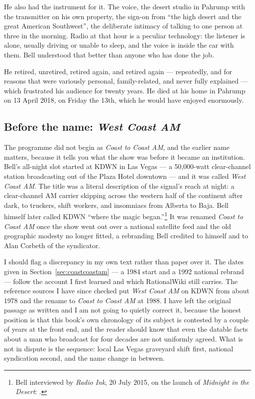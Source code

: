 He also had the instrument for it. The voice, the desert studio in Pahrump with the transmitter on his
own property, the sign-on from ``the high desert and the great American Southwest'', the deliberate
intimacy of talking to one person at three in the morning. Radio at that hour is a peculiar
technology: the listener is alone, usually driving or unable to sleep, and the voice is inside the car
with them. Bell understood that better than anyone who has done the job.

He retired, unretired, retired again, and retired again --- repeatedly, and for reasons that were
variously personal, family-related, and never fully explained --- which frustrated his audience for
twenty years. He died at his home in Pahrump on 13 April 2018, on Friday the 13th, which he would
have enjoyed enormously.

\subsection{Before the name: \emph{West Coast AM}}\label{sec:westcoastam}

The programme did not begin as \emph{Coast to Coast AM}, and the earlier name matters, because it tells
you what the show was before it became an institution. Bell's all-night slot started at KDWN in Las
Vegas --- a 50,000-watt clear-channel station broadcasting out of the Plaza Hotel downtown --- and it
was called \emph{West Coast AM}. The title was a literal description of the signal's reach at night: a
clear-channel AM carrier skipping across the western half of the continent after dark, to truckers,
shift workers, and insomniacs from Alberta to Baja. Bell himself later called KDWN ``where the magic
began.''\footnote{Bell interviewed by \emph{Radio Ink}, 20 July 2015, on the launch of
\emph{Midnight in the Desert}: .}
It was renamed \emph{Coast to Coast AM} once the show went out over a national satellite feed and the
old geographic modesty no longer fitted, a rebranding Bell credited to himself and to Alan Corbeth of
the syndicator.


I should flag a discrepancy in my own text rather than paper over it. The dates given in
Section~\ref{sec:coastcoastam} --- a 1984 start and a 1992 national rebrand --- follow the account I
first learned and which RationalWiki still carries. The reference sources I have since checked put
\emph{West Coast AM} on KDWN from about 1978 and the rename to \emph{Coast to Coast AM} at 1988. I have
left the original passage as written and I am not going to quietly correct it, because the honest
position is that this book's own chronology of its subject is contested by a couple of years at the
front end, and the reader should know that even the datable facts about a man who broadcast for four
decades are not uniformly agreed. What is not in dispute is the sequence: local Las Vegas graveyard
shift first, national syndication second, and the name change in between.

